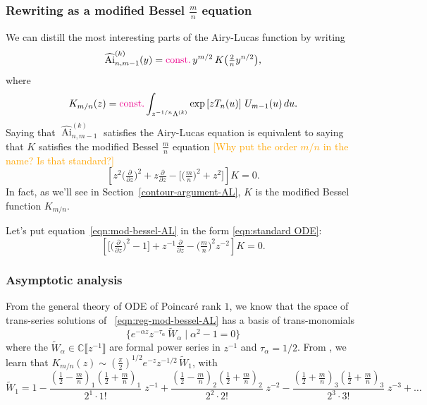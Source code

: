 \documentclass{article}
\newcommand{\C}{\mathbb{C}}
\newcommand{\series}[1]{\tilde{#1}}
\DeclareMathOperator{\Ai}{Ai}
\theoremstyle{definition}
\theoremstyle{plain}
\begin{document}
{\subsubsection{Rewriting as a modified Bessel $\frac{m}{n}$ equation}
We can distill the most interesting parts of the Airy-Lucas function by writing
\[ \widehat{\Ai}^{(k)}_{n, m-1}(y) = \textcolor{magenta}{\text{const.}}\,y^{{m/2}}\,K\big(\tfrac{2}{n} y^{n/2}\big), \]
where
\begin{equation}\label{integral:mod-bessel-rational-AL}
K_{m/n}(z) = \textcolor{magenta}{\text{const.}} \int_{z^{-{1/n}}\Lambda^{(k)}} \exp\left[z T_n(u)\right]\,U_{m-1}(u)\,du.
\end{equation}
Saying that $\widehat{\Ai}^{(k)}_{n, m-1}$ satisfies the Airy-Lucas equation is equivalent to saying that $K$ satisfies the modified Bessel $\frac{m}{n}$ equation \textcolor{orange}{[Why put the order $m/n$ in the name? Is that standard?]}
\begin{equation}\label{eqn:mod-bessel-AL}
\left[z^2 \big(\tfrac{\partial}{\partial z}\big)^2 + z \tfrac{\partial}{\partial z} - \big[\big(\tfrac{m}{n} \big)^2 + z^2\big]\right] K = 0.
\end{equation}
In fact, as we’ll see in Section~\ref{contour-argument-AL}, $K$ is the modified Bessel function $K_{{m/n}}$.

Let's put equation~\eqref{eqn:mod-bessel-AL} in the form \eqref{eqn:standard ODE}:
\begin{equation}\label{eqn:reg-mod-bessel-AL}
\left[ \big[ \big(\tfrac{\partial}{\partial z}\big)^2 - 1 \big] + z^{-1} \tfrac{\partial}{\partial z} - \big({\tfrac{m}{n}}\big)^2 z^{-2} \right] K = 0.
\end{equation}

\subsubsection{Asymptotic analysis}\label{sec:asympt-AL}

From the general theory of ODE of Poincar\'e rank $1$, we know that the space of trans-series solutions of ~\eqref{eqn:reg-mod-bessel-AL} has a basis of trans-monomials
\[ \{ e^{-\alpha z} z^{-\tau_\alpha}\,\series{W}_\alpha \mid \alpha^2 - 1 = 0 \} \]
where the $\series{W}_\alpha\in\C\llbracket z^{-1} \rrbracket$ are formal power series in $z^{-1}$ and $\tau_\alpha=1/2$. From \cite[Equations 10.40.2 and 10.17.1]{dlmf}, we learn that $K_{m/n}(z) \sim \left(\tfrac{\pi}{2}\right)^{1/2} e^{-z} z^{-1/2}\,\series{W}_1$, with
\begin{equation}\label{bessel-asymp-AL}
\series{W}_1 = 1 - \frac{(\tfrac{1}{2}-\tfrac{m}{n})_1 (\tfrac{1}{2}+\frac{m}{n})_1}{2^1 \cdot 1!}\;z^{-1} + \frac{(\tfrac{1}{2}-\tfrac{m}{n})_2 (\tfrac{1}{2}+\tfrac{m}{n})_2}{2^2 \cdot 2!}\;z^{-2} - \frac{(\tfrac{1}{2}+\tfrac{m}{n})_3 (\tfrac{1}{2}+\tfrac{m}{n})_3}{2^3 \cdot 3!}\;z^{-3} + \ldots
\end{equation}

}
\end{document}

